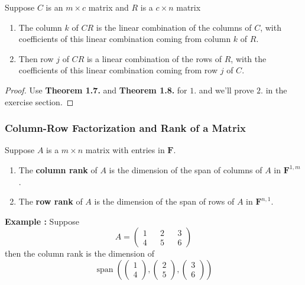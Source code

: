 \begin{theorem}
    Suppose $C$ is an $m \times c$ matrix and $R$ is a $c \times n$ matrix
    \begin{enumerate}
        \item The column $k$ of $CR$ is the linear combination of the columns of $C$, with coefficients of this linear combination coming
              from column $k$ of $R$.
        \item Then row $j$ of $CR$ is a linear combination of the rows of $R$, with the coefficients of this linear combination coming from
              row $j$ of $C$.
    \end{enumerate}
\end{theorem}

\begin{proof}
    Use \textbf{Theorem 1.7.} and \textbf{Theorem 1.8.} for $1.$ and we'll prove $2.$ in the exercise section.
\end{proof}

\subsubsection{Column-Row Factorization and Rank of a Matrix}

\begin{definition}
    Suppose $A$ is a $m \times n$ matrix with entries in $\mathbf{F}$.
    \begin{enumerate}
        \item The \textbf{column rank} of $A$ is the dimension of the span of columns of $A$ in $\mathbf{F}^{1,m}$. 
        \item The \textbf{row rank} of $A$ is the dimension of the span of rows of $A$ in $\mathbf{F}^{n,1}$.
    \end{enumerate}
\end{definition}

\textbf{Example :}
Suppose 
\[ A = \begin{pmatrix}
    1 && 2 && 3 \\
    4 && 5 && 6 
\end{pmatrix} \]
then the column rank is the dimension of 
\[ \operatorname{span}\left( \begin{pmatrix}
    1 \\ 4
\end{pmatrix} , \begin{pmatrix}
    2 \\ 5
\end{pmatrix}, \begin{pmatrix}
    3 \\ 6
\end{pmatrix} \right) \]

